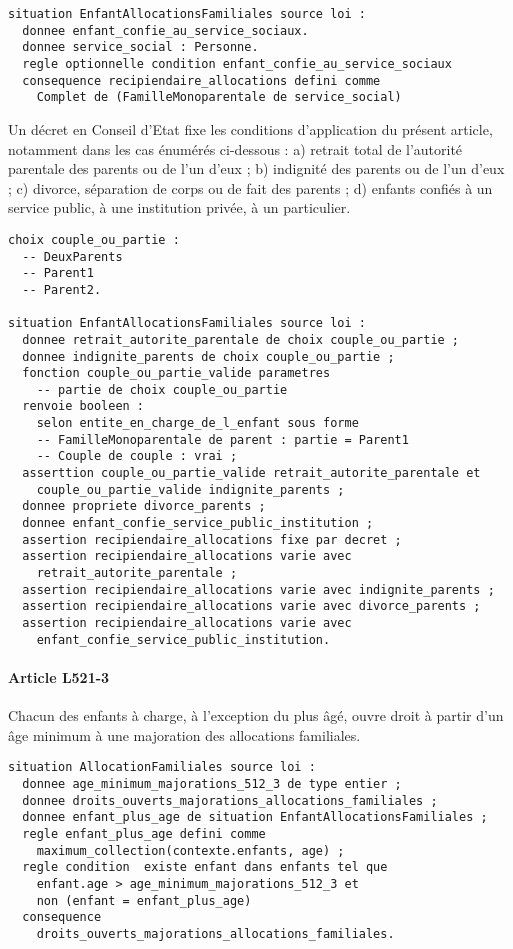 \documentclass[11pt, french]{article}
\begin{document}
\begin{lstlisting}
situation EnfantAllocationsFamiliales source loi :
  donnee enfant_confie_au_service_sociaux.
  donnee service_social : Personne.
  regle optionnelle condition enfant_confie_au_service_sociaux
  consequence recipiendaire_allocations defini comme
    Complet de (FamilleMonoparentale de service_social)
\end{lstlisting}

Un décret en Conseil d'Etat fixe les conditions d'application du présent article, notamment dans les cas énumérés ci-dessous :
a) retrait total de l'autorité parentale des parents ou de l'un d'eux ;
b) indignité des parents ou de l'un d'eux ;
c) divorce, séparation de corps ou de fait des parents ;
d) enfants confiés à un service public, à une institution privée, à un particulier.
\begin{lstlisting}
choix couple_ou_partie :
  -- DeuxParents
  -- Parent1
  -- Parent2.

situation EnfantAllocationsFamiliales source loi :
  donnee retrait_autorite_parentale de choix couple_ou_partie ;
  donnee indignite_parents de choix couple_ou_partie ;
  fonction couple_ou_partie_valide parametres
    -- partie de choix couple_ou_partie
  renvoie booleen :
    selon entite_en_charge_de_l_enfant sous forme
    -- FamilleMonoparentale de parent : partie = Parent1
    -- Couple de couple : vrai ;
  asserttion couple_ou_partie_valide retrait_autorite_parentale et
    couple_ou_partie_valide indignite_parents ;
  donnee propriete divorce_parents ;
  donnee enfant_confie_service_public_institution ;
  assertion recipiendaire_allocations fixe par decret ;
  assertion recipiendaire_allocations varie avec
    retrait_autorite_parentale ;
  assertion recipiendaire_allocations varie avec indignite_parents ;
  assertion recipiendaire_allocations varie avec divorce_parents ;
  assertion recipiendaire_allocations varie avec
    enfant_confie_service_public_institution.
\end{lstlisting}

\paragraph{Article L521-3} Chacun des enfants à charge, à l'exception du plus âgé, ouvre droit à partir d'un âge minimum à une majoration des allocations familiales.
\begin{lstlisting}
situation AllocationFamiliales source loi :
  donnee age_minimum_majorations_512_3 de type entier ;
  donnee droits_ouverts_majorations_allocations_familiales ;
  donnee enfant_plus_age de situation EnfantAllocationsFamiliales ;
  regle enfant_plus_age defini comme
    maximum_collection(contexte.enfants, age) ;
  regle condition  existe enfant dans enfants tel que
    enfant.age > age_minimum_majorations_512_3 et
    non (enfant = enfant_plus_age)
  consequence
    droits_ouverts_majorations_allocations_familiales.
\end{lstlisting}
\end{document}
